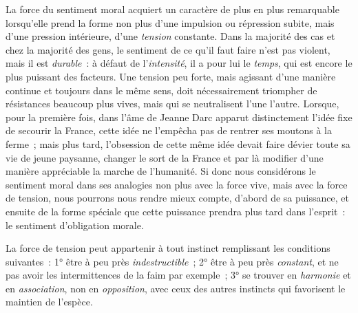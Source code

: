 \documentclass[french,twoside]{book} %
\begin{document}
La force du sentiment moral acquiert un caractère de plus en plus remarquable lorsqu’elle prend la forme non plus d’une impulsion ou répression subite, mais d’une pression intérieure, d’une \emph{tension} constante. Dans la majorité des cas et chez la majorité des gens, le sentiment de ce qu’il faut faire n’est pas violent, mais il est \emph{durable} : à défaut de l’\emph{intensité}, il a pour lui le \emph{temps}, qui est encore le plus puissant des facteurs. Une tension peu forte, mais agissant d’une manière continue et toujours dans le même sens, doit nécessairement triompher de résistances beaucoup plus vives, mais qui se neutralisent l’une l’autre. Lorsque, pour la première fois, dans l’âme de Jeanne Darc apparut distinctement l’idée fixe de secourir la France, cette idée ne l’empêcha pas de rentrer ses moutons à la ferme ; mais plus tard, l’obsession de cette même idée devait faire dévier toute sa vie de jeune paysanne, changer le sort de la France et par là modifier d’une manière appréciable la marche de l’humanité. Si donc nous considérons le sentiment moral dans ses analogies non plus avec la force vive, mais avec la force de tension, nous pourrons nous rendre mieux compte, d’abord de sa puissance, et ensuite de la forme spéciale que cette puissance prendra plus tard dans l’esprit : le sentiment d’obligation morale.\par
La force de tension peut appartenir à tout instinct remplissant les conditions suivantes : 1° être à peu près \emph{indestructible} ; 2° être à peu près \emph{constant}, et ne pas avoir les intermittences de la faim par exemple ; 3° se trouver en \emph{harmonie} et en \emph{association}, non en \emph{opposition}, avec ceux des autres instincts qui favorisent le maintien de l’espèce.\par
\end{document}

